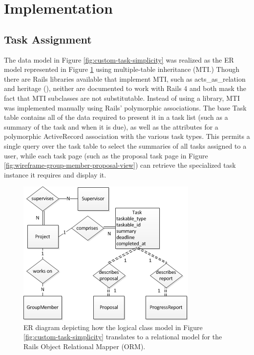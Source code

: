 \section{Implementation}
\label{sec:4ys-implementation}


\subsection{Task Assignment}
The data model in Figure \ref{fig:custom-task-simplicity} was realized as the ER model represented in Figure \ref{fig:custom-task-er-model} using multiple-table inheritance (MTI.) Though there are Rails libraries available that implement MTI, such as acts\_as\_relation and heritage (), neither are documented to work with Rails 4 and both mask the fact that MTI subclasses are not substitutable. Instead of using a library, MTI was implemented manually using Rails’ polymorphic associations. The base Task table contains all of the data required to present it in a task list (such as a summary of the task and when it is due), as well as the attributes for a polymorphic ActiveRecord association with the various task types. This permits a single query over the task table to select the summaries of all tasks assigned to a user, while each task page (such as the proposal task page in Figure \ref{fig:wireframe-group-member-proposal-view}) can retrieve the specialized task instance it requires and display it.

\begin{figure}[!htbp]
\centering \includegraphics{./img/case-study-fourth-year-system/task-through-project-er-model}
\caption{ER diagram depicting how the logical class model in Figure \ref{fig:custom-task-simplicity} translates to a relational model for the Rails Object Relational Mapper (ORM).}
\label{fig:custom-task-er-model}
\end{figure}

